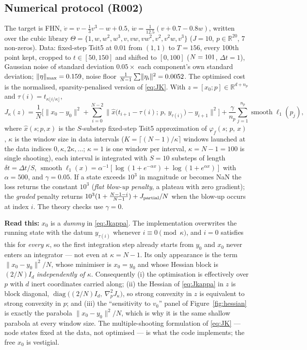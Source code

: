 \documentclass[11pt]{article}
\theoremstyle{remark}\newtheorem{remark}{Remark}
\newcommand{\norm}[1]{\lVert #1\rVert}
\newcommand{\flow}[3]{\varphi_f(#1;\,#2,\,#3)}
\newcommand{\readthis}[1]{\textbf{Read this:} #1}
\begin{document}
\subsection{Numerical protocol (R002)}\label{sec:protocol}
The target is FHN, $\dot v=v-\tfrac13v^3-w+0.5$, $\dot w=\tfrac1{12.5}(v+0.7-0.8w)$, written over the cubic library $\Theta=\{1,w,w^2,w^3,v,vw,vw^2,v^2,v^2w,v^3\}$ ($J=10$, $p\in\mathbb R^{20}$, 7 non-zeros). Data: fixed-step Tsit5 at $0.01$ from $(1,1)$ to $T=156$, every 100th point kept, cropped to $t\in[50,150]$ and shifted to $[0,100]$ ($N=101$, $\Delta t=1$), Gaussian noise of standard deviation $0.05\times$ each component's own standard deviation; $\norm{\eta}_{\max}=\netaMax$, noise floor $\tfrac1{N-1}\sum\norm{\eta_i}^2=\nnoiseFloor$. The optimised cost is the normalised, sparsity-penalised version of \eqref{eq:JK}. With $z=[x_0;p]\in\mathbb R^{d+n_p}$ and $\tau(i)=t_{\kappa\lfloor i/\kappa\rfloor}$,
\begin{equation}
J_\kappa(z)=\frac1N\Big[\norm{x_0-y_0}^2
 +\sum_{i=0}^{N-2}\big\lVert\hat x\big(t_{i+1}-\tau(i);\,p,\,y_{\tau(i)}\big)-y_{i+1}\big\rVert^2\Big]
 +\frac{\gamma}{n_p}\sum_{j=1}^{n_p}\operatorname{smooth}\ell_1(p_j),
\label{eq:Jkappa}
\end{equation}
where $\hat x(s;p,x)$ is the $S$-substep fixed-step Tsit5 approximation of $\flow{s}{p}{x}$, $\kappa$ is the window size in data intervals ($K=\lceil(N-1)/\kappa\rceil$ windows launched at the data indices $0,\kappa,2\kappa,\dots$; $\kappa=1$ is one window per interval, $\kappa=N-1=100$ is single shooting), each interval is integrated with $S=10$ substeps of length $\delta t=\Delta t/S$, $\operatorname{smooth}\ell_1(x)=\alpha^{-1}[\log(1+e^{-\alpha x})+\log(1+e^{\alpha x})]$ with $\alpha=500$, and $\gamma=0.05$. If a state exceeds $10^3$ in magnitude or becomes NaN the loss returns the constant $10^3$ (\emph{flat blow-up penalty}, a plateau with zero gradient); the \emph{graded} penalty returns $10^3(1+\tfrac{N-1-i}{N-1})+J_{\rm partial}/N$ when the blow-up occurs at index $i$. The theory checks use $\gamma=0$.

\readthis{$x_0$ is a \emph{dummy} in \eqref{eq:Jkappa}. The implementation overwrites the running state with the datum $y_{\tau(i)}$ whenever $i\equiv0\pmod\kappa$, and $i=0$ satisfies this for \emph{every} $\kappa$, so the first integration step already starts from $y_0$ and $x_0$ never enters an integrator --- not even at $\kappa=N-1$. Its only appearance is the term $\norm{x_0-y_0}^2/N$, whose minimiser is $x_0=y_0$ and whose Hessian block is $(2/N)I_d$ \emph{independently of $\kappa$}. Consequently (i) the optimisation is effectively over $p$ with $d$ inert coordinates carried along; (ii) the Hessian of \eqref{eq:Jkappa} in $z$ is block diagonal, $\operatorname{diag}\big((2/N)I_d,\ \nabla^2_p J_\kappa\big)$, so strong convexity in $z$ is equivalent to strong convexity in $p$; and (iii) the ``sensitivity to $v_0$'' panel of Figure~\ref{fig:hessian} is exactly the parabola $\norm{x_0-y_0}^2/N$, which is why it is the same shallow parabola at every window size. The multiple-shooting formulation of \eqref{eq:JK} --- node states fixed at the data, not optimised --- is what the code implements; the free $x_0$ is vestigial.}
\end{document}
